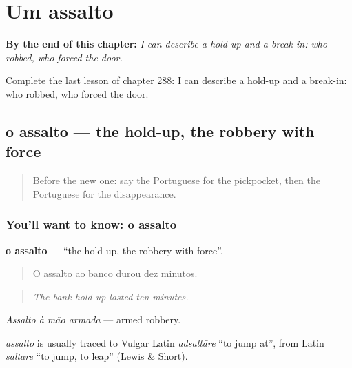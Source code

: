 
\chapter{Um assalto}
\label{ch:pt-um-assalto}

\begin{chapteropening}
\textbf{By the end of this chapter:} \emph{I can describe a hold-up and a break-in: who robbed, who forced the door.}

Complete the last lesson of chapter 288: I can describe a hold-up and a break-in: who robbed, who forced the door.
\end{chapteropening}

\section[o assalto]{o assalto — the hold-up, the robbery with force}

\label{lesson:PT-C288-assalto}



\begin{quote}
Before the new one: say the Portuguese for the pickpocket, then the Portuguese for the disappearance.
\end{quote}

\subsection*{You'll want to know: o assalto}
\textbf{o assalto} — \textquotedblleft{}the hold-up, the robbery with force\textquotedblright{}.

\begin{quote}
O assalto ao banco durou dez minutos.
\end{quote}

\begin{quote}
\emph{The bank hold-up lasted ten minutes.}
\end{quote}

\emph{Assalto à mão armada} — armed robbery.

\begin{cousinweb}
\emph{assalto} is usually traced to Vulgar Latin \emph{adsaltāre} \textquotedblleft{}to jump at\textquotedblright{}, from Latin \emph{saltāre} \textquotedblleft{}to jump, to leap\textquotedblright{} (Lewis \& Short).
\end{cousinweb}

